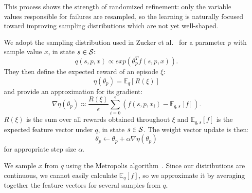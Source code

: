 This process shows the strength of randomized refinement: only the variable
values responsible for failures are resampled, so the learning is naturally
focused toward improving sampling distributions which are not yet well-shaped.

We adopt the sampling distribution used in Zucker et al.~\cite{workspacebias}
for a parameter $p$ with sample value $x$, in state $s \in \mathcal{S}$:
$$q(s, p, x) \propto exp(\theta_{p}^{T} f(s, p, x)).$$
They then define the expected reward of an episode $\xi$:
$$\eta(\theta_{p}) = \mathbb{E}_{q}[R(\xi)]$$ and provide an approximation for its gradient:
$$\nabla \eta(\theta_{p}) \approx \frac{R(\xi)}{\epsilon} \sum_{i=0}^{\epsilon}(f(s, p, x_{i}) - \mathbb{E}_{q,s}[f]).$$
$R(\xi)$ is the sum over all rewards obtained throughout $\xi$ and
$\mathbb{E}_{q,s}[f]$ is the expected feature vector under $q$, in state $s \in \mathcal{S}$. The weight vector update is then:
$$\theta_{p} \leftarrow \theta_{p} + \alpha \nabla \eta(\theta_{p})$$
for appropriate step size $\alpha$.

We sample $x$ from $q$ using the Metropolis algorithm~\cite{chib1995understanding}.
Since our distributions are continuous, we cannot easily calculate $\mathbb{E}_{q}[f]$,
so we approximate it by averaging together the feature vectors for several samples from $q$.


